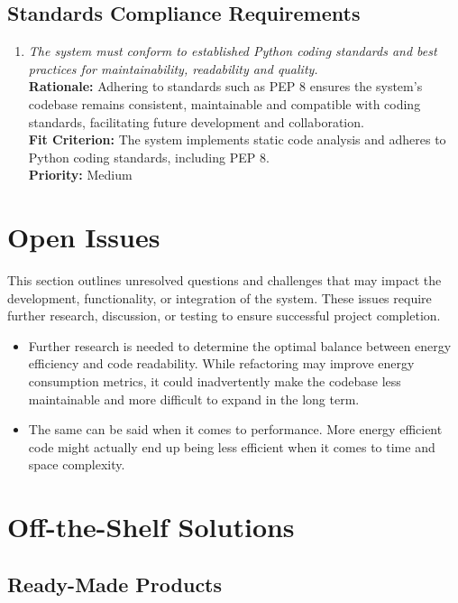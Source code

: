 \documentclass[12pt]{article}
\begin{document}
\subsection{Standards Compliance Requirements}
\begin{enumerate}[label=CR-SCR \arabic*., wide=0pt, leftmargin=*]
  \item \emph{The system must conform to established Python coding
      standards and best practices for maintainability, readability and
    quality.}\\[2mm]
    {\bf Rationale:} Adhering to standards such as PEP 8 ensures the
    system’s codebase remains consistent, maintainable and compatible
    with coding standards, facilitating future development and collaboration.\\
    {\bf Fit Criterion:} The system implements static code analysis
    and adheres to Python coding standards, including PEP 8.\\
    {\bf Priority:} Medium
\end{enumerate}

\section{Open Issues}

This section outlines unresolved questions and challenges that may
impact the development, functionality, or integration of the system.
These issues require further research, discussion, or testing to
ensure successful project completion.\\

\begin{itemize}
  \item Further research is needed to determine the optimal balance
    between energy efficiency and code readability. While refactoring
    may improve energy consumption metrics, it could inadvertently
    make the codebase less maintainable and more difficult to expand
    in the long term.
  \item The same can be said when it comes to performance. More
    energy efficient code might actually end up being less efficient
    when it comes to time and space complexity.
\end{itemize}

\section{Off-the-Shelf Solutions}
\subsection{Ready-Made Products}
\end{document}
